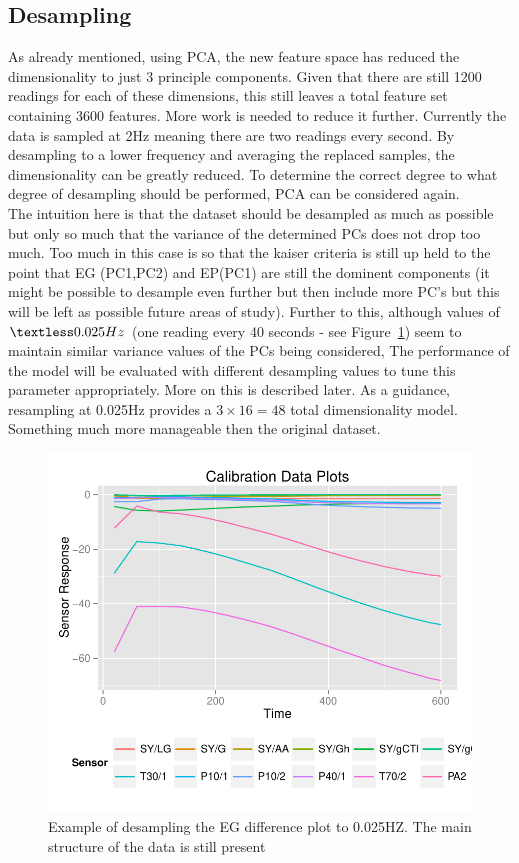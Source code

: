 \documentclass[twocolumn]{article}
\begin{document}
\subsection{Desampling}
\label{sec:desampling}
As already mentioned, using PCA, the new feature space has reduced the dimensionality to just 3 principle components. Given that there are still
1200 readings for each of these dimensions, this still leaves a total feature set containing 3600 features. More work is needed
to reduce it further. Currently the data is sampled at 2Hz meaning there are two readings every second. By desampling to a lower 
frequency and averaging the replaced samples, the dimensionality can be greatly reduced. To determine the correct degree to what degree of desampling 
should be performed, PCA can be considered again.\\
The intuition here is that the dataset should be desampled as much as possible but only so much that the variance of the determined PCs
does not drop too much. Too much in this case is so that the kaiser criteria is still up held to the point that EG (PC1,PC2) and EP(PC1) are still
the dominent components (it might be possible to desample even further but then include more PC's but this will be left as possible future 
areas of study). Further to this, although values of $\textless 0.025Hz$ (one reading every 40 seconds - see Figure~\ref{fig:desampledExample}) 
seem to maintain similar variance values of the PCs being considered, The performance of the model will be evaluated with different desampling
values to tune this parameter appropriately. More on this is described later. As a guidance, resampling at 0.025Hz provides a $3 \times 16 = 48$ 
total dimensionality model. Something much more manageable then the original dataset.

\begin{figure}[h!]
	\includegraphics[trim = 0mm 0mm 0mm 0mm, clip, scale=0.55]{deSampledExample.pdf}
	\caption{Example of desampling the EG difference plot to 0.025HZ. The main structure of the data is still present}
	\label{fig:desampledExample}
\end{figure}
\end{document}
